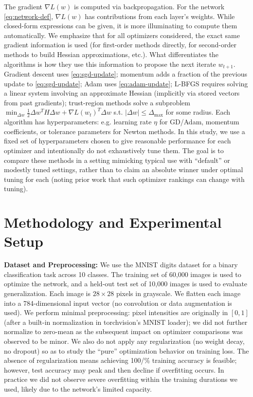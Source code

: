 \documentclass[12pt]{article}
\begin{document}
The gradient $\nabla L(w)$ is computed via backpropagation. For the network \eqref{eq:network-def}, $\nabla L(w)$ has contributions from each layer's weights. While closed-form expressions can be given, it is more illuminating to compute them automatically. We emphasize that for all optimizers considered, the exact same gradient information is used (for first-order methods directly, for second-order methods to build Hessian approximations, etc.). What differentiates the algorithms is how they use this information to propose the next iterate $w_{t+1}$. Gradient descent uses \eqref{eq:sgd-update}; momentum adds a fraction of the previous update to \eqref{eq:sgd-update}; Adam uses \eqref{eq:adam-update}; L-BFGS requires solving a linear system involving an approximate Hessian (implicitly via stored vectors from past gradients); trust-region methods solve a subproblem $\min_{\Delta w} \frac{1}{2}\Delta w^T H \Delta w + \nabla L(w_t)^T \Delta w$ s.t. $|\Delta w| \leq \Delta_{\max}$ for some radius. Each algorithm has hyperparameters: e.g. learning rate $\eta$ for GD/Adam, momentum coefficients, or tolerance parameters for Newton methods. In this study, we use a fixed set of hyperparameters chosen to give reasonable performance for each optimizer and intentionally do not exhaustively tune them. The goal is to compare these methods in a setting mimicking typical use with “default” or modestly tuned settings, rather than to claim an absolute winner under optimal tuning for each (noting prior work that such optimizer rankings can change with tuning).

\section{Methodology and Experimental Setup} \label{methodology}
\textbf{Dataset and Preprocessing:} We use the MNIST digits dataset \cite{LeCun1998MNIST} for a binary classification task across 10 classes. The training set of 60,000 images is used to optimize the network, and a held-out test set of 10,000 images is used to evaluate generalization. Each image is $28\times 28$ pixels in grayscale. We flatten each image into a 784-dimensional input vector (no convolution or data augmentation is used). We perform minimal preprocessing: pixel intensities are originally in $[0,1]$ (after a built-in normalization in torchvision’s MNIST loader); we did not further normalize to zero-mean as the subsequent impact on optimizer comparisons was observed to be minor. We also do not apply any regularization (no weight decay, no dropout) so as to study the “pure” optimization behavior on training loss. The absence of regularization means achieving 100/\% training accuracy is feasible; however, test accuracy may peak and then decline if overfitting occurs. In practice we did not observe severe overfitting within the training durations we used, likely due to the network’s limited capacity.
\end{document}
